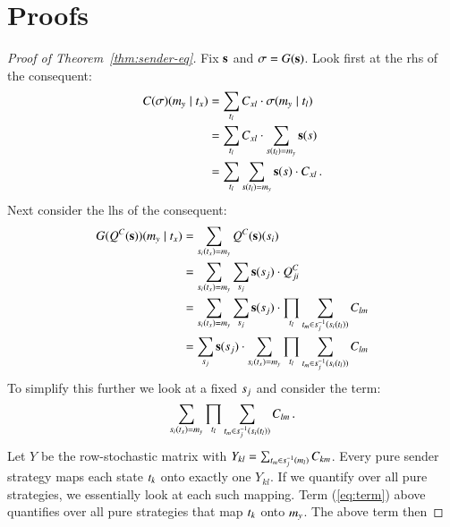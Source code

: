 \appendix

\section{Proofs}
\label{sec:proofs}


\begin{proof}[Proof of Theorem~\ref{thm:sender-eq}]
  Fix $\mathrm{\mathbf{s}}$ and $\sigma = G(\mathrm{\mathbf{s}})$. Look first at the rhs of
  the consequent:
  \begin{align*}
    C(\sigma)(m_y \mid t_x) & =  \sum_{t_l} C_{xl}
    \cdot \sigma(m_y \mid t_l) \\
    & =  \sum_{t_l} C_{xl}
    \cdot  \sum_{s(t_l) = m_y} \mathrm{\mathbf{s}}(s) \\
    & = \sum_{t_l}
    \sum_{s(t_l) = m_y} \mathrm{\mathbf{s}}(s) \cdot C_{xl}\,.
  \end{align*}
  Next consider the lhs of the consequent:
  \begin{align*}
    G(Q^C(\mathrm{\mathbf{s}}))(m_y \mid t_x) & =
    \sum_{s_i(t_x)=m_y} Q^C(\mathrm{\mathbf{s}})(s_i) \\
    & = \sum_{s_i(t_x)=m_y} \sum_{s_j}
    \mathrm{\mathbf{s}}(s_j) \cdot Q^C_{ji} \\
    & = \sum_{s_i(t_x)=m_y} \sum_{s_j}
    \mathrm{\mathbf{s}}(s_j) \cdot \prod_{t_l} \sum_{t_m \in
      s_j^{-1}(s_i(t_l))} C_{lm} \\
    & = \sum_{s_j} \mathrm{\mathbf{s}}(s_j) \cdot
    \sum_{s_i(t_x)=m_y} \prod_{t_l}
    \sum_{t_m \in s_j^{-1}(s_i(t_l))} C_{lm}
  \end{align*}
  To simplify this further we look at a fixed $s_j$ and consider
  the term: 
  \begin{align}
    \label{eq:term}
    \sum_{s_i(t_x)=m_y} \prod_{t_l} \sum_{t_m
      \in s_j^{-1}(s_i(t_l))} C_{lm}\,.
  \end{align}
  Let $Y$ be the row-stochastic matrix with $Y_{kl} = \sum_{t_m
    \in s_j^{-1}(m_l)} C_{km}$. Every pure sender strategy
  maps each state $t_k$ onto exactly one $Y_{kl}$. If we quantify
  over all pure strategies, we essentially look at each such
  mapping. Term (\ref{eq:term}) above quantifies over all pure
  strategies that map $t_k$ onto $m_y$. The above term then

\end{proof}
